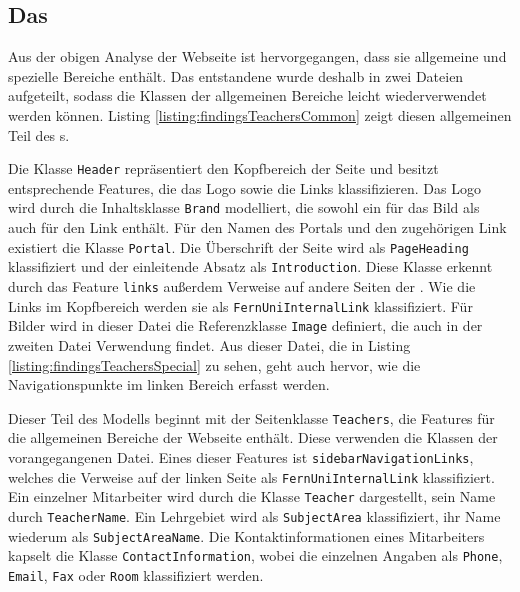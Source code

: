 \subsection{Das {\classificationModel}}
    \label{section:findingsTeachersClassificationModel}
    Aus der obigen Analyse der Webseite ist hervorgegangen,
    dass sie allgemeine und spezielle Bereiche enthält.
    Das entstandene {\classificationModel} wurde deshalb in zwei Dateien aufgeteilt,
    sodass die Klassen der allgemeinen Bereiche leicht wiederverwendet werden können.
    Listing \ref{listing:findingsTeachersCommon} zeigt diesen allgemeinen
    Teil des {\classificationModel}s.

    

    Die Klasse \texttt{Header} repräsentiert den Kopfbereich der Seite
    und besitzt entsprechende Features,
    die das Logo sowie die Links klassifizieren.
    Das Logo wird durch die Inhaltsklasse \texttt{Brand} modelliert,
    die sowohl ein {} für das Bild als auch für den Link enthält.
    Für den Namen des Portals und den zugehörigen Link existiert die Klasse \texttt{Portal}.
    Die Überschrift der Seite wird als \texttt{PageHeading} klassifiziert und
    der einleitende Absatz als \texttt{Introduction}.
    Diese Klasse erkennt durch das Feature \texttt{links} außerdem Verweise auf andere Seiten der {\fernUni}.
    Wie die Links im Kopfbereich werden sie als \texttt{FernUniInternalLink} klassifiziert.
    Für Bilder wird in dieser Datei die Referenzklasse \texttt{Image} definiert,
    die auch in der zweiten Datei Verwendung findet.
    Aus dieser Datei, die in Listing \ref{listing:findingsTeachersSpecial} zu sehen,
    geht auch hervor, wie die Navigationspunkte im linken Bereich erfasst werden.

    

    Dieser Teil des Modells beginnt mit der Seitenklasse \texttt{Teachers},
    die Features für die allgemeinen Bereiche der Webseite enthält.
    Diese verwenden die Klassen der vorangegangenen Datei.
    Eines dieser Features ist \texttt{sidebarNavigationLinks},
    welches die Verweise auf der linken Seite als \texttt{FernUniInternalLink}
    klassifiziert.
    Ein einzelner Mitarbeiter wird durch die Klasse \texttt{Teacher} dargestellt,
    sein Name durch \texttt{TeacherName}.
    Ein Lehrgebiet wird als \texttt{SubjectArea} klassifiziert,
    ihr Name wiederum als \texttt{SubjectAreaName}.
    Die Kontaktinformationen eines Mitarbeiters kapselt die Klasse \texttt{ContactInformation},
    wobei die einzelnen Angaben als \texttt{Phone}, \texttt{Email}, \texttt{Fax} oder \texttt{Room}
    klassifiziert werden.

